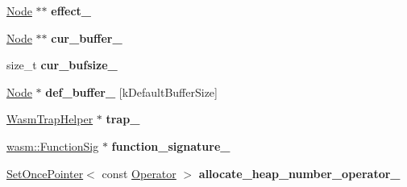 \begin{DoxyCompactItemize}
\item 
\hyperlink{classv8_1_1internal_1_1compiler_1_1_node}{Node} $\ast$$\ast$ {\bfseries effect\+\_\+}\hypertarget{classv8_1_1internal_1_1compiler_1_1_wasm_graph_builder_a1dc39c8934c221444d2603768dc6c25f}{}\label{classv8_1_1internal_1_1compiler_1_1_wasm_graph_builder_a1dc39c8934c221444d2603768dc6c25f}

\item 
\hyperlink{classv8_1_1internal_1_1compiler_1_1_node}{Node} $\ast$$\ast$ {\bfseries cur\+\_\+buffer\+\_\+}\hypertarget{classv8_1_1internal_1_1compiler_1_1_wasm_graph_builder_af41767c808cb75b8502b131787c65298}{}\label{classv8_1_1internal_1_1compiler_1_1_wasm_graph_builder_af41767c808cb75b8502b131787c65298}

\item 
size\+\_\+t {\bfseries cur\+\_\+bufsize\+\_\+}\hypertarget{classv8_1_1internal_1_1compiler_1_1_wasm_graph_builder_a95007dfef53598b9cf430b94337788b7}{}\label{classv8_1_1internal_1_1compiler_1_1_wasm_graph_builder_a95007dfef53598b9cf430b94337788b7}

\item 
\hyperlink{classv8_1_1internal_1_1compiler_1_1_node}{Node} $\ast$ {\bfseries def\+\_\+buffer\+\_\+} \mbox{[}k\+Default\+Buffer\+Size\mbox{]}\hypertarget{classv8_1_1internal_1_1compiler_1_1_wasm_graph_builder_a4a492b86f1d9287b8429d4eef0d5be87}{}\label{classv8_1_1internal_1_1compiler_1_1_wasm_graph_builder_a4a492b86f1d9287b8429d4eef0d5be87}

\item 
\hyperlink{classv8_1_1internal_1_1compiler_1_1_wasm_trap_helper}{Wasm\+Trap\+Helper} $\ast$ {\bfseries trap\+\_\+}\hypertarget{classv8_1_1internal_1_1compiler_1_1_wasm_graph_builder_a4171dbbd95935d747a532d3d580f7205}{}\label{classv8_1_1internal_1_1compiler_1_1_wasm_graph_builder_a4171dbbd95935d747a532d3d580f7205}

\item 
\hyperlink{classv8_1_1internal_1_1_signature}{wasm\+::\+Function\+Sig} $\ast$ {\bfseries function\+\_\+signature\+\_\+}\hypertarget{classv8_1_1internal_1_1compiler_1_1_wasm_graph_builder_a8002b3eeaea44ba6e230df9c22d8a3e3}{}\label{classv8_1_1internal_1_1compiler_1_1_wasm_graph_builder_a8002b3eeaea44ba6e230df9c22d8a3e3}

\item 
\hyperlink{classv8_1_1internal_1_1_set_once_pointer}{Set\+Once\+Pointer}$<$ const \hyperlink{classv8_1_1internal_1_1compiler_1_1_operator}{Operator} $>$ {\bfseries allocate\+\_\+heap\+\_\+number\+\_\+operator\+\_\+}\hypertarget{classv8_1_1internal_1_1compiler_1_1_wasm_graph_builder_abe4807cd074284d09fb6efac81766247}{}\label{classv8_1_1internal_1_1compiler_1_1_wasm_graph_builder_abe4807cd074284d09fb6efac81766247}


\end{DoxyCompactItemize}
